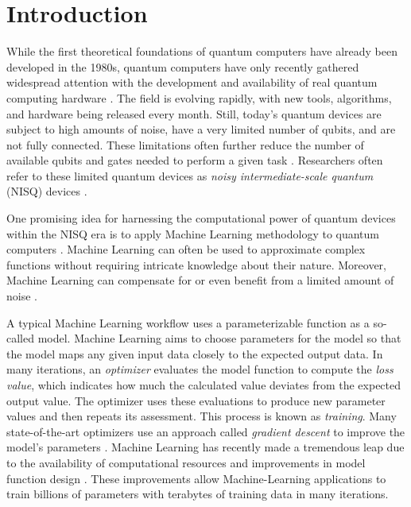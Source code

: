 \chapter{Introduction}
\label{chap:intro}

While the first theoretical foundations of quantum computers have already been
developed in the 1980s, quantum computers have only recently gathered widespread
attention with the development and availability of real quantum computing
hardware \cite{nielsen_quantum_2007,hidary_quantum_2021}.
The field is evolving rapidly, with new tools, algorithms, and hardware being
released every month.
Still, today's quantum devices are subject to high amounts of noise, have a very
limited number of qubits, and are not fully connected.
These limitations often further reduce the number of available qubits and gates
needed to perform a given task \cite{cerezo_variational_2021}.
Researchers often refer to these limited quantum devices as
\emph{noisy intermediate-scale quantum} (NISQ) devices
\cite{preskill_quantum_2018}.

One promising idea for harnessing the computational power of quantum devices
within the NISQ era is to apply Machine Learning methodology to quantum
computers \cite{cerezo_variational_2021}.
Machine Learning can often be used to approximate complex functions without
requiring intricate knowledge about their nature.
Moreover, Machine Learning can compensate for or even benefit from a limited
amount of noise \cite{ciliberto_quantum_2018}.

A typical Machine Learning workflow uses a parameterizable function as a
so-called model.
Machine Learning aims to choose parameters for the model so that the model maps
any given input data closely to the expected output data.
In many iterations, an \emph{optimizer} evaluates the model function to compute
the \emph{loss value}, which indicates how much the calculated value deviates
from the expected output value.
The optimizer uses these evaluations to produce new parameter values and then
repeats its assessment.
This process is known as \emph{training}.
Many state-of-the-art optimizers use an approach called \emph{gradient descent}
to improve the model's parameters \cite{benedetti_parameterized_2019}.
Machine Learning has recently made a tremendous leap due to the availability of
computational resources and improvements in model function design
\cite{jordan_machine_2015}.
These improvements allow Machine-Learning applications to train billions of
parameters with terabytes of training data in many iterations.

